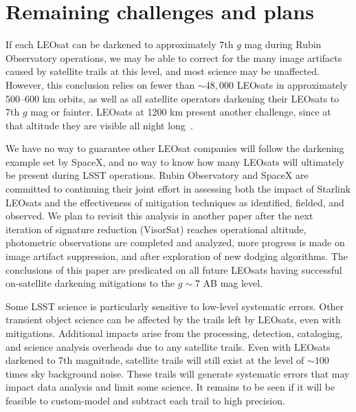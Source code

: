 \documentclass[twocolumn,trackchanges]{aastex63}
\begin{document}

\section{Remaining challenges and plans}
\label{sec:challenges}

If each LEOsat can be darkened to approximately 7th $g$ mag during Rubin Observatory operations, we may be able to correct for the many image artifacts caused by satellite trails at this level, and most science may be unaffected. However, this
conclusion relies on fewer than $\sim48,000$ LEOsats in approximately 500--600 km orbits, as well as all satellite operators darkening their LEOsats to 7th $g$ mag or fainter.
LEOsats at 1200 km present another challenge, since at that altitude they are visible all night long~\citep{2020AAS...23541003S}. 

We have no way to guarantee other LEOsat companies will follow the darkening example set by SpaceX, and no way to know how many LEOsats will ultimately be present during LSST operations. Rubin Observatory and SpaceX are committed to continuing their joint effort in assessing both the impact of Starlink LEOsats and the effectiveness of mitigation techniques as identified, fielded, and observed. We plan to revisit this analysis in another paper after the next iteration of signature reduction (VisorSat) reaches operational altitude, photometric observations are completed and analyzed, more progress is made on image artifact suppression, and after exploration of new dodging algorithms. The conclusions of this paper are predicated on all future LEOsats having successful on-satellite darkening mitigations to the $g\sim7$ AB mag level.

Some LSST science is particularly sensitive to low-level systematic errors. Other transient object science can be affected by the trails left by LEOsats, even with mitigations. Additional impacts arise from the processing, detection, cataloging, and science analysis overheads due to any satellite trails. Even with LEOsats darkened to 7th magnitude, satellite trails will still exist at the level of $\sim100$ times sky background noise. These trails will generate systematic errors that may impact data analysis and limit some science.
It remains to be seen if it will be feasible to custom-model and subtract each trail to high precision.
\end{document}

